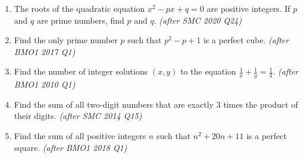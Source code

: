 \begin{enumerate}
\item The roots of the quadratic equation $x^2 - px + q = 0$ are positive integers. If $p$ and $q$ are prime numbers, find $p$ and $q$. \textit{\small(after SMC 2020 Q24)}

\item Find the only prime number $p$ such that $p^2 - p + 1$ is a perfect cube. \textit{\small(after BMO1 2017 Q1)}


\item Find the number of integer solutions $(x,y)$ to the equation $\frac{1}{x} + \frac{1}{y} = \frac{1}{3}$. \textit{\small(after BMO1 2010 Q1)}

\item Find the sum of all two-digit numbers that are exactly $3$ times the product of their digits. \textit{\small(after SMC 2014 Q15)}

\item Find the sum of all positive integers $n$ such that $n^2 + 20n + 11$ is a perfect square. \textit{\small(after BMO1 2018 Q1)}
\end{enumerate}
